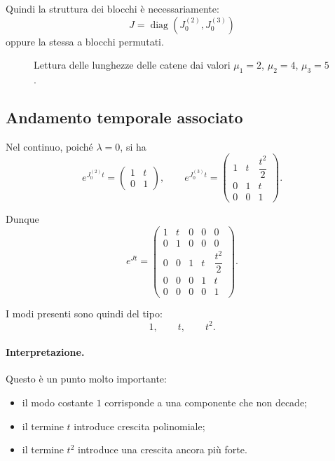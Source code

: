 Quindi la struttura dei blocchi è necessariamente:
\[
J = \operatorname{diag}\!\left(J_0^{(2)}, J_0^{(3)}\right)
\]
oppure la stessa a blocchi permutati.

\begin{figure}[H]
\centering
{}
\caption{Lettura delle lunghezze delle catene dai valori $\mu_1=2$, $\mu_2=4$, $\mu_3=5$.}
\end{figure}

\subsection{Andamento temporale associato}

Nel continuo, poiché $\lambda=0$, si ha
\[
e^{J_0^{(2)}t}
=
\begin{pmatrix}
1 & t\\
0 & 1
\end{pmatrix},
\qquad
e^{J_0^{(3)}t}
=
\begin{pmatrix}
1 & t & \dfrac{t^2}{2}\\
0 & 1 & t\\
0 & 0 & 1
\end{pmatrix}.
\]

Dunque
\[
e^{Jt}
=
\begin{pmatrix}
1 & t & 0 & 0 & 0\\
0 & 1 & 0 & 0 & 0\\
0 & 0 & 1 & t & \dfrac{t^2}{2}\\
0 & 0 & 0 & 1 & t\\
0 & 0 & 0 & 0 & 1
\end{pmatrix}.
\]

I modi presenti sono quindi del tipo:
\[
1,\qquad t,\qquad t^2.
\]

\paragraph{Interpretazione.}
Questo è un punto molto importante:
\begin{itemize}
    \item il modo costante $1$ corrisponde a una componente che non decade;
    \item il termine $t$ introduce crescita polinomiale;
    \item il termine $t^2$ introduce una crescita ancora più forte.
\end{itemize}

